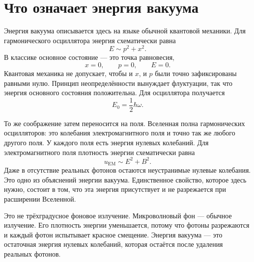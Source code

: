 \section{Что означает энергия вакуума}

Энергия вакуума описывается здесь на языке обычной квантовой механики. Для гармонического осциллятора энергия схематически равна
\begin{equation}
E\sim p^2+x^2.
\end{equation}
В классике основное состояние — это точка равновесия,
\begin{equation}
x=0,\qquad p=0,\qquad E=0.
\end{equation}
Квантовая механика не допускает, чтобы и \(x\), и \(p\) были точно зафиксированы равными нулю. Принцип неопределённости вынуждает флуктуации, так что энергия основного состояния положительна. Для осциллятора получается
\begin{equation}
E_0=\frac{1}{2}\hbar\omega.
\end{equation}

То же соображение затем переносится на поля. Вселенная полна гармонических осцилляторов: это колебания электромагнитного поля и точно так же любого другого поля. У каждого поля есть энергия нулевых колебаний. Для электромагнитного поля плотность энергии схематически равна
\begin{equation}
u_{\mathrm{EM}}\sim E^2+B^2.
\end{equation}
Даже в отсутствие реальных фотонов остаются неустранимые нулевые колебания. Это одно из объяснений энергии вакуума. Единственное свойство, которое здесь нужно, состоит в том, что эта энергия присутствует и не разрежается при расширении Вселенной.

\begin{classroomqa}
\end{classroomqa}

Это не трёхградусное фоновое излучение. Микроволновый фон — обычное излучение. Его плотность энергии уменьшается, потому что фотоны разрежаются и каждый фотон испытывает красное смещение. Энергия вакуума — это остаточная энергия нулевых колебаний, которая остаётся после удаления реальных фотонов.

